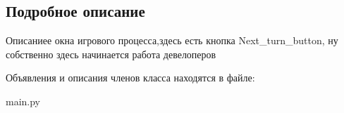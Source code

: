 \subsection{Подробное описание}
Описаниее окна игрового процесса,здесь есть кнопка Next\+\_\+turn\+\_\+button, ну собственно здесь начинается работа девелоперов 

Объявления и описания членов класса находятся в файле\+:\begin{DoxyCompactItemize}
\item 
main.\+py\end{DoxyCompactItemize}
